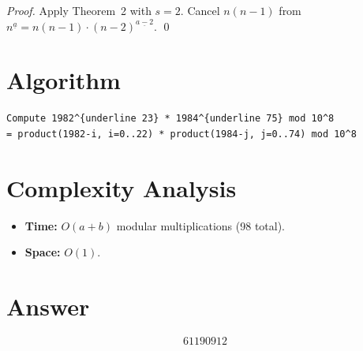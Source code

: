 \documentclass[12pt]{article}
\begin{document}
\begin{proof}
Apply Theorem~2 with $s = 2$. Cancel $n(n-1)$ from $n^{\underline{a}} = n(n-1) \cdot (n-2)^{\underline{a-2}}$. \qed
\end{proof}

\section{Algorithm}

\begin{verbatim}
Compute 1982^{underline 23} * 1984^{underline 75} mod 10^8
= product(1982-i, i=0..22) * product(1984-j, j=0..74) mod 10^8
\end{verbatim}

\section{Complexity Analysis}

\begin{itemize}
    \item \textbf{Time:} $O(a + b)$ modular multiplications (98 total).
    \item \textbf{Space:} $O(1)$.
\end{itemize}

\section{Answer}

\[
\boxed{61190912}
\]
\end{document}
